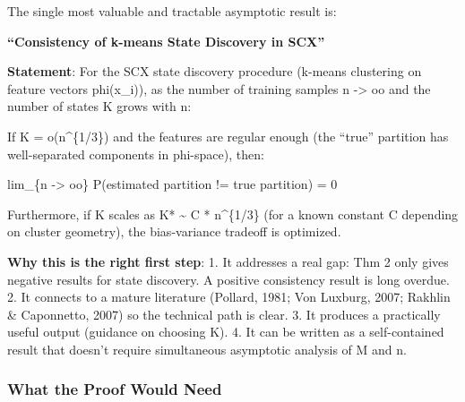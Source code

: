 \documentclass[
  12pt,
]{article}
\begin{document}
The single most valuable and tractable asymptotic result is:

\textbf{``Consistency of k-means State Discovery in SCX''}

\textbf{Statement}: For the SCX state discovery procedure (k-means
clustering on feature vectors phi(x\_i)), as the number of training
samples n -\textgreater{} oo and the number of states K grows with n:

If K = o(n\^{}\{1/3\}) and the features are regular enough (the ``true''
partition has well-separated components in phi-space), then:

lim\_\{n -\textgreater{} oo\} P(estimated partition != true partition) =
0

Furthermore, if K scales as K* \textasciitilde{} C * n\^{}\{1/3\} (for a
known constant C depending on cluster geometry), the bias-variance
tradeoff is optimized.

\textbf{Why this is the right first step}: 1. It addresses a real gap:
Thm 2 only gives negative results for state discovery. A positive
consistency result is long overdue. 2. It connects to a mature
literature (Pollard, 1981; Von Luxburg, 2007; Rakhlin \& Caponnetto,
2007) so the technical path is clear. 3. It produces a practically
useful output (guidance on choosing K). 4. It can be written as a
self-contained result that doesn't require simultaneous asymptotic
analysis of M and n.

\subsubsection{What the Proof Would
Need}\label{what-the-proof-would-need}
\end{document}
